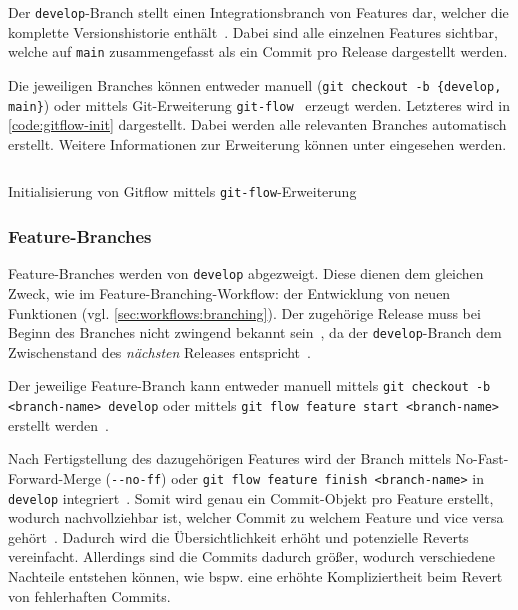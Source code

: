 Der \texttt{develop}-Branch stellt einen Integrationsbranch von Features dar, welcher die komplette Versionshistorie enthält~\cite{atlassianGitflowWorkflow}. Dabei sind alle einzelnen Features sichtbar, welche auf \texttt{main} zusammengefasst als ein Commit pro Release dargestellt werden.

Die jeweiligen Branches können entweder manuell (\texttt{git checkout -b \{develop, main\}}) oder mittels Git\hyp Erweiterung \texttt{git-flow}~\cite{driessenGitflow2012} erzeugt werden. Letzteres wird in \autoref{code:gitflow-init} dargestellt. Dabei werden alle relevanten Branches automatisch erstellt. Weitere Informationen zur Erweiterung können unter \cite{kummerGitflowcheatsheet2023} eingesehen werden.

\begin{listing}
\inputminted[breaklines]{text}{src/assets/code/gitflow/gitflow_init.sh}
\caption{Initialisierung von Gitflow mittels \texttt{git-flow}-Erweiterung}
\label{code:gitflow-init}
\end{listing}


\subsubsection{Feature-Branches}

Feature\hyp Branches werden von \texttt{develop} abgezweigt. Diese dienen dem gleichen Zweck, wie im Feature\hyp Branching\hyp Workflow: der Entwicklung von neuen Funktionen (vgl. \autoref{sec:workflows:branching}). Der zugehörige Release muss bei Beginn des Branches nicht zwingend bekannt sein~\cite{driessenSuccessfulGitBranching2010}, da der \texttt{develop}\hyp Branch dem Zwischenstand des \emph{nächsten} Releases entspricht~\cite{atlassianGitflowWorkflow}.

Der jeweilige Feature\hyp Branch kann entweder manuell mittels \texttt{git checkout -b <branch-name> develop} oder mittels \texttt{git flow feature start <branch-name>} erstellt werden~\cite{driessenGitflow2012}.

Nach Fertigstellung des dazugehörigen Features wird der Branch mittels No\hyp Fast\hyp Forward\hyp Merge (\verb|--no-ff|) oder \texttt{git flow feature finish <branch-name>} in \texttt{develop} integriert~\cite{driessenSuccessfulGitBranching2010,driessenGitflow2012}. Somit wird genau ein Commit\hyp Objekt pro Feature erstellt, wodurch nachvollziehbar ist, welcher Commit zu welchem Feature und vice versa gehört~\cite{driessenSuccessfulGitBranching2010}. Dadurch wird die Übersichtlichkeit erhöht und potenzielle Reverts vereinfacht. Allerdings sind die Commits dadurch größer, wodurch verschiedene Nachteile entstehen können, wie bspw. eine erhöhte Kompliziertheit beim Revert von fehlerhaften Commits.

